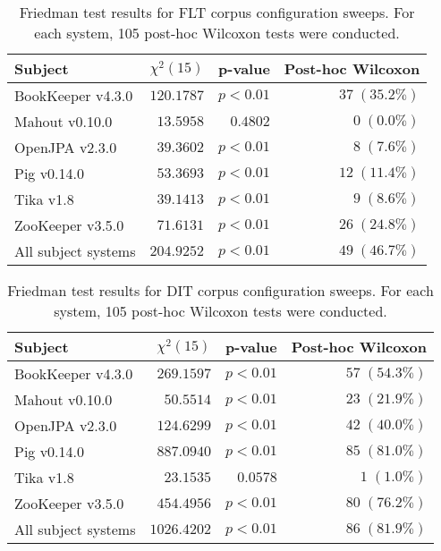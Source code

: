 \begin{table}
\begin{spacing}{1.2}
\centering
\caption{Friedman test results for FLT corpus configuration sweeps. For each system, 105 post-hoc Wilcoxon tests were conducted.}
\label{table:combo-friedman-flt}
\begin{tabular}{lrrr}
\toprule
                      Subject & $\chi^2(15)$ &  p-value & Post-hoc Wilcoxon \\
\midrule
            BookKeeper v4.3.0 &   $120.1787$ & $p<0.01$ &    $37\;(35.2\%)$ \\
               Mahout v0.10.0 &    $13.5958$ & $0.4802$ &      $0\;(0.0\%)$ \\
               OpenJPA v2.3.0 &    $39.3602$ & $p<0.01$ &      $8\;(7.6\%)$ \\
                  Pig v0.14.0 &    $53.3693$ & $p<0.01$ &    $12\;(11.4\%)$ \\
                    Tika v1.8 &    $39.1413$ & $p<0.01$ &      $9\;(8.6\%)$ \\
             ZooKeeper v3.5.0 &    $71.6131$ & $p<0.01$ &    $26\;(24.8\%)$ \\
 \midrule
All subject systems &   $204.9252$ & $p<0.01$ &    $49\;(46.7\%)$ \\
\bottomrule
\end{tabular}

\end{spacing}
\end{table}

\begin{table}
\begin{spacing}{1.2}
\centering
\caption{Friedman test results for DIT corpus configuration sweeps. For each system, 105 post-hoc Wilcoxon tests were conducted.}
\label{table:combo-friedman-dit}
\begin{tabular}{lrrr}
\toprule
                      Subject & $\chi^2(15)$ &  p-value & Post-hoc Wilcoxon \\
\midrule
            BookKeeper v4.3.0 &   $269.1597$ & $p<0.01$ &    $57\;(54.3\%)$ \\
               Mahout v0.10.0 &    $50.5514$ & $p<0.01$ &    $23\;(21.9\%)$ \\
               OpenJPA v2.3.0 &   $124.6299$ & $p<0.01$ &    $42\;(40.0\%)$ \\
                  Pig v0.14.0 &   $887.0940$ & $p<0.01$ &    $85\;(81.0\%)$ \\
                    Tika v1.8 &    $23.1535$ & $0.0578$ &      $1\;(1.0\%)$ \\
             ZooKeeper v3.5.0 &   $454.4956$ & $p<0.01$ &    $80\;(76.2\%)$ \\
 \midrule
All subject systems &  $1026.4202$ & $p<0.01$ &    $86\;(81.9\%)$ \\
\bottomrule
\end{tabular}

\end{spacing}
\end{table}

